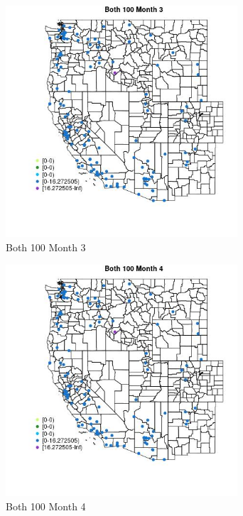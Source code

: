 \begin{figure} 
\centering  
\includegraphics[width=0.77\textwidth]{Code_Outputs/Report_ML_input_PM25_Step4_part_e_de_duplicated_aves_MapObsMo3Both_100.jpg} 
\caption{\label{fig:Report_ML_input_PM25_Step4_part_e_de_duplicated_avesMapObsMo3Both_100}Both 100 Month 3} 
\end{figure} 
 

\clearpage 

\begin{figure} 
\centering  
\includegraphics[width=0.77\textwidth]{Code_Outputs/Report_ML_input_PM25_Step4_part_e_de_duplicated_aves_MapObsMo4Both_100.jpg} 
\caption{\label{fig:Report_ML_input_PM25_Step4_part_e_de_duplicated_avesMapObsMo4Both_100}Both 100 Month 4} 
\end{figure} 
 

